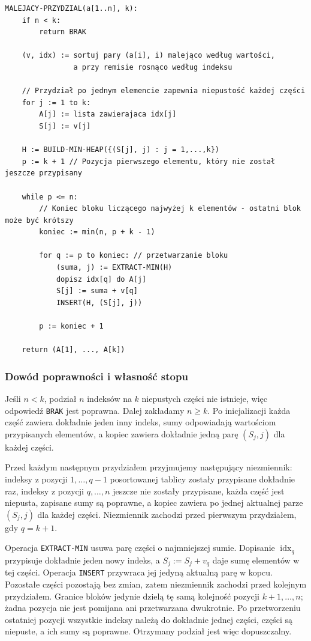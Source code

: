 \documentclass[11pt]{article}
\begin{document}
\begin{verbatim}
MALEJACY-PRZYDZIAL(a[1..n], k):
    if n < k:
        return BRAK 

    (v, idx) := sortuj pary (a[i], i) malejąco według wartości, 
                a przy remisie rosnąco według indeksu

    // Przydział po jednym elemencie zapewnia niepustość każdej części
    for j := 1 to k: 
        A[j] := lista zawierajaca idx[j] 
        S[j] := v[j]

    H := BUILD-MIN-HEAP({(S[j], j) : j = 1,...,k})
    p := k + 1 // Pozycja pierwszego elementu, który nie został jeszcze przypisany

    while p <= n: 
        // Koniec bloku liczącego najwyżej k elementów - ostatni blok może być krótszy
        koniec := min(n, p + k - 1) 
       
        for q := p to koniec: // przetwarzanie bloku
            (suma, j) := EXTRACT-MIN(H)
            dopisz idx[q] do A[j]
            S[j] := suma + v[q]
            INSERT(H, (S[j], j))

        p := koniec + 1

    return (A[1], ..., A[k])
\end{verbatim}

\subsubsection{Dowód poprawności i własność stopu}

Jeśli $n<k$, podział $n$ indeksów na $k$ niepustych części nie istnieje,
więc odpowiedź \texttt{BRAK} jest poprawna. Dalej zakładamy $n\geq k$.
Po inicjalizacji każda część zawiera dokładnie jeden inny indeks, sumy
odpowiadają wartościom przypisanych elementów, a kopiec zawiera dokładnie
jedną parę $(S_j,j)$ dla każdej części.

Przed każdym następnym przydziałem przyjmujemy następujący niezmiennik:
indeksy z pozycji $1,\ldots,q-1$ posortowanej tablicy zostały przypisane
dokładnie raz, indeksy z pozycji $q,\ldots,n$ jeszcze nie zostały
przypisane, każda część jest niepusta, zapisane sumy są poprawne,
a kopiec zawiera po jednej aktualnej parze $(S_j,j)$ dla każdej części.
Niezmiennik zachodzi przed pierwszym przydziałem, gdy $q=k+1$.

Operacja \texttt{EXTRACT-MIN} usuwa parę części o najmniejszej sumie.
Dopisanie $\operatorname{idx}_q$ przypisuje dokładnie jeden nowy indeks,
a $S_j:=S_j+v_q$ daje sumę elementów w tej części. Operacja
\texttt{INSERT} przywraca jej jedyną aktualną parę w kopcu. Pozostałe
części pozostają bez zmian, zatem niezmiennik zachodzi przed kolejnym
przydziałem. Granice bloków jedynie dzielą tę samą kolejność pozycji
$k+1,\ldots,n$; żadna pozycja nie jest pomijana ani przetwarzana
dwukrotnie. Po przetworzeniu ostatniej pozycji wszystkie indeksy należą
do dokładnie jednej części, części są niepuste, a ich sumy są poprawne.
Otrzymany podział jest więc dopuszczalny.
\end{document}
